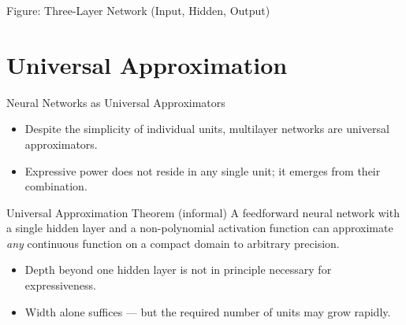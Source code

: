 \begin{frame}{Figure: Three-Layer Network (Input, Hidden, Output)}
\begin{center}
  \end{center}
\end{frame}

\section{Universal Approximation}

\begin{frame}{Neural Networks as Universal Approximators}
  \begin{itemize}
    \item Despite the simplicity of individual units, multilayer networks are \alert{universal approximators}.
    \item Expressive power does not reside in any single unit; it \alert{emerges from their combination}.
  \end{itemize}
  \begin{block}{Universal Approximation Theorem (informal)}
    A feedforward neural network with a \alert{single hidden layer} and a non-polynomial activation
    function can approximate \emph{any} continuous function on a compact domain to arbitrary precision.
  \end{block}
  \begin{itemize}
    \item Depth beyond one hidden layer is not \alert{in principle} necessary for expressiveness.
    \item Width alone suffices — but the required number of units may grow rapidly.
  \end{itemize}
\end{frame}

